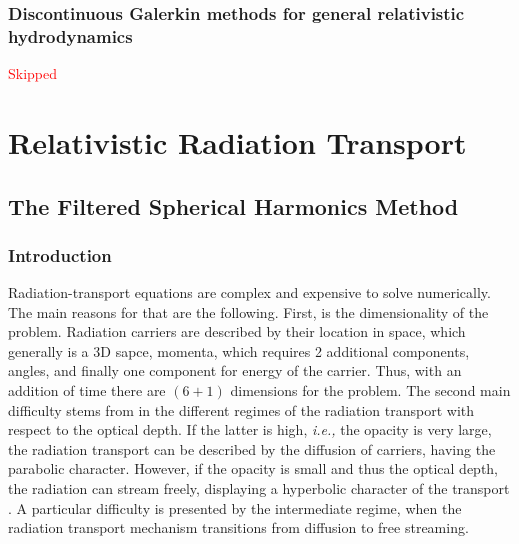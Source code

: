\documentclass[11pt,a4paper,headinclude=true,DIV=14,BCOR=8mm,chapterprefix,listof=totoc,twoside,openright,abstracton]{scrbook}
\begin{document}
\section{Discontinuous Galerkin methods for general relativistic hydrodynamics}
\textcolor{red}{Skipped}




\part{Relativistic Radiation Transport}
\chapter{The Filtered Spherical Harmonics Method}
\section{Introduction}

Radiation-transport equations are complex and expensive to solve numerically. The main reasons for that are the following. First, is the dimensionality of the problem. Radiation carriers are described by their location in space, which generally is a 3D sapce, momenta, which requires 2 additional components, angles, and finally one component for energy of the carrier. Thus, with an addition of time there are $(6+1)$ dimensions for the problem. The second main difficulty stems from in the different regimes of the radiation transport with respect to the optical depth. If the latter is high, \textit{i.e.,} the opacity is very large, the radiation transport can be described by the diffusion of carriers, having the parabolic character. However, if the opacity is small and thus the optical depth, the radiation can stream freely, displaying a hyperbolic character of the transport \cite{Mihalas:1984}. A particular difficulty is presented by the intermediate regime, when the radiation transport mechanism transitions from diffusion to free streaming. 
\end{document}
